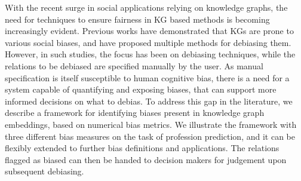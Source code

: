 With the recent surge in social applications relying on knowledge graphs, the need for techniques to  ensure fairness in KG based methods is becoming increasingly evident. Previous works have  demonstrated that KGs are prone to various social biases, and have proposed multiple methods for  debiasing them. However, in such studies, the focus has been on debiasing techniques, while the  relations to be debiased are specified manually by the user. As manual specification is itself susceptible to human cognitive bias, there is a need for a system capable of quantifying and exposing biases, that can support more informed decisions on what to debias. To address this gap in the literature, we describe a framework for identifying biases present in knowledge graph embeddings, based on numerical bias metrics. We illustrate the framework with three different bias measures on the task of profession prediction, and it can be flexibly extended to further bias definitions and applications. The relations flagged as biased can then be handed to decision makers for judgement upon subsequent debiasing.
